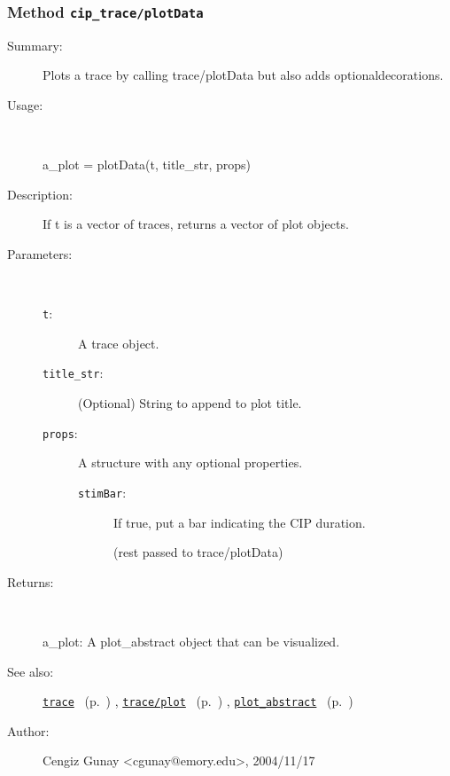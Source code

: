 \subsubsection[Method \texttt{plotData}]{Method \texttt{cip\_trace/plotData}}%
%
\label{ref_cip_trace__plotData}%
\hypertarget{ref_cip_trace__plotData}{}%
\begin{description}
\item[Summary:]Plots a trace by calling trace/plotData but also adds optionaldecorations.
%
\item[Usage:]~%
\begin{lyxcode}%
a\_plot = plotData(t, title\_str, props)
%
\end{lyxcode}%
%
\item[Description:]%
If t is a vector of traces, returns a vector of plot objects.
\item[Parameters:]~
\begin{description}%
\item[\texttt{t}:]
 A trace object.
\item[\texttt{title\_str}:]
 (Optional) String to append to plot title.
\item[\texttt{props}:]
 A structure with any optional properties.
\begin{description}%
\item[\texttt{stimBar}:]
 If true, put a bar indicating the CIP duration.

(rest passed to trace/plotData)
\end{description}%
\end{description}%
%
\item[Returns:
]~

	a\_plot: A plot\_abstract object that can be visualized.
%
%
\item[See also:]%
\hyperlink{ref_trace}{\texttt{trace}}%
\ (p.~\pageref{ref_trace})%
%
, \hyperlink{ref_trace__plot}{\texttt{trace/plot}}%
\ (p.~\pageref{ref_trace__plot})%
%
, \hyperlink{ref_plot_abstract}{\texttt{plot\_abstract}}%
\ (p.~\pageref{ref_plot_abstract})%
%
%
\item[Author:]%
Cengiz Gunay <cgunay@emory.edu>, 2004/11/17
%
\end{description}
\methodline%
